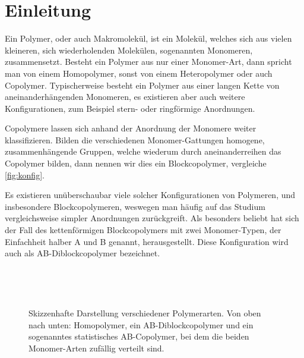
\chapter{Einleitung} %
\label{cha:einleitung}


Ein Polymer, oder auch Makromolekül, ist ein Molekül, welches sich aus vielen kleineren, sich wiederholenden Molekülen, sogenannten Monomeren, zusammensetzt.
Besteht ein Polymer aus nur einer Monomer-Art, dann spricht man von einem Homopolymer, sonst von einem Heteropolymer oder auch Copolymer.
Typischerweise besteht ein Polymer aus einer langen Kette von aneinanderhängenden Monomeren, es existieren aber auch weitere Konfigurationen, zum Beispiel stern- oder ringförmige Anordnungen.

Copolymere lassen sich anhand der Anordnung der Monomere weiter klassifizieren.
Bilden die verschiedenen Monomer-Gattungen homogene, zusammenhängende Gruppen, welche wiederum durch aneinanderreihen das Copolymer bilden, dann nennen wir dies ein Blockcopolymer, vergleiche \autoref{fig:konfig}.

Es existieren unüberschaubar viele solcher Konfigurationen von Polymeren, und insbesondere Blockcopolymeren, weswegen man häufig auf das Studium vergleichsweise simpler Anordnungen zurückgreift.
Als besonders beliebt hat sich der Fall des kettenförmigen Blockcopolymers mit zwei Monomer-Typen, der Einfachheit halber A und B genannt, herausgestellt.
Diese Konfiguration wird auch als AB-Diblockcopolymer bezeichnet.

\begin{figure}[tb]
    \centering
    \begin{subfigure}[b]{\textwidth}
        \centering
        
    \end{subfigure}
    \\[1em]
    \begin{subfigure}[b]{\textwidth}
        \centering
        
    \end{subfigure}
    \\[1em]
    \begin{subfigure}[b]{\textwidth}
        \centering
        
    \end{subfigure}
    \caption[Skizzenhafte Darstellung verschiedener Polymerarten]{%
        Skizzenhafte Darstellung verschiedener Polymerarten.
        Von oben nach unten: Homopolymer, ein AB-Diblockcopolymer und ein sogenanntes statistisches AB-Copolymer, bei dem die beiden Monomer-Arten zufällig verteilt sind.
    }
    \label{fig:konfig}
\end{figure}

